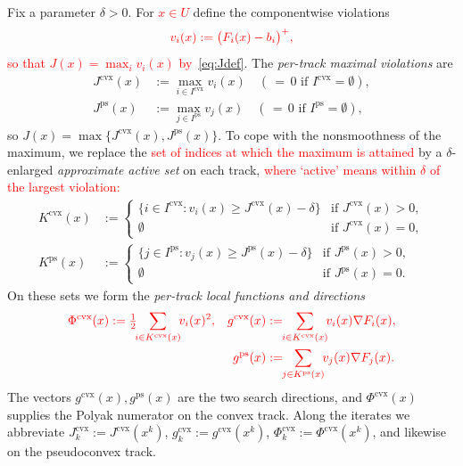 \documentclass[]{interact}
\theoremstyle{plain}
\theoremstyle{definition}
\theoremstyle{remark}
\newcommand{\cvx}{\mathrm{cvx}}
\newcommand{\ps}{\mathrm{ps}}
\begin{document}
Fix a parameter $\delta>0$. For \leavevmode\textcolor{red}{$x\in U$} define the componentwise violations
\begin{equation}\label{eq:vi}\textcolor{red}{
v_i(x):=\bigl(F_i(x)-b_i\bigr)^+,
}\end{equation}
\leavevmode\textcolor{red}{so that $J(x)=\max_i v_i(x)$ by~\eqref{eq:Jdef}}. The \emph{per-track maximal violations} are
\begin{align}
J^{\cvx}(x)&:=\max_{i\in I^{\cvx}}v_i(x)\quad(\,{=}\,0\text{ if }I^{\cvx}=\emptyset),\label{eq:Jcvx}\\
J^{\ps}(x)&:=\max_{j\in I^{\ps}}v_j(x)\quad(\,{=}\,0\text{ if }I^{\ps}=\emptyset),\label{eq:Jps}
\end{align}
so $J(x)=\max\{J^{\cvx}(x),J^{\ps}(x)\}$. To cope with the nonsmoothness of the maximum, we replace the \leavevmode\textcolor{red}{set of indices at which the maximum is attained} by a $\delta$-enlarged \emph{approximate active set} on each track, \leavevmode\textcolor{red}{where `active' means within $\delta$ of the largest violation:}
\begin{align}
K^{\cvx}(x)&:=\begin{cases}\{i\in I^{\cvx}:v_i(x)\ge J^{\cvx}(x)-\delta\} & \text{if }J^{\cvx}(x)>0,\\ \emptyset & \text{if }J^{\cvx}(x)=0,\end{cases}\label{eq:Kcvx}\\[2pt]
K^{\ps}(x)&:=\begin{cases}\{j\in I^{\ps}:v_j(x)\ge J^{\ps}(x)-\delta\} & \text{if }J^{\ps}(x)>0,\\ \emptyset & \text{if }J^{\ps}(x)=0.\end{cases}\label{eq:Kps}
\end{align}
On these sets we form the \emph{per-track local functions and directions}
\begin{align}\color{red}
\Phi^{\cvx}(x)&\color{red}:=\tfrac12\!\!\sum_{i\in K^{\cvx}(x)}\!\! v_i(x)^2, &\color{red} g^{\cvx}(x)&\color{red}:=\!\!\sum_{i\in K^{\cvx}(x)}\!\! v_i(x)\nabla F_i(x),\label{eq:phi-g-cvx}\\\color{red}
&\color{red} &\color{red} g^{\ps}(x)&\color{red}:=\!\!\sum_{j\in K^{\ps}(x)}\!\! v_j(x)\nabla F_j(x).\label{eq:phi-g-ps}
\end{align}
The vectors $g^{\cvx}(x),g^{\ps}(x)$ are the two search directions, and $\Phi^{\cvx}(x)$ supplies the Polyak numerator on the convex track. Along the iterates we abbreviate $J^{\cvx}_k:=J^{\cvx}(x^k)$, $g^{\cvx}_k:=g^{\cvx}(x^k)$, $\Phi^{\cvx}_k:=\Phi^{\cvx}(x^k)$, and likewise on the pseudoconvex track.
\end{document}
